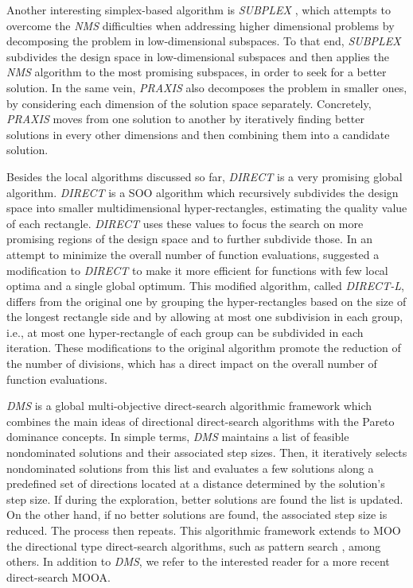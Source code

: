	Another interesting simplex-based algorithm is \textit{SUBPLEX} \cite{Rowan1990}, which attempts to overcome the \textit{\ac{NMS}} difficulties when addressing higher dimensional problems by decomposing the problem in low-dimensional subspaces. To that end, \textit{SUBPLEX} subdivides the design space in low-dimensional subspaces and then applies the \textit{\ac{NMS}} algorithm to the most promising subspaces, in order to seek for a better solution. %
	In the same vein, \textit{\ac{PRAXIS}} \cite{Brent1973} also decomposes the problem in smaller ones, by considering each dimension of the solution space separately. Concretely, \textit{\ac{PRAXIS}} moves from one solution to another by iteratively finding better solutions in every other dimensions and then combining them into a candidate solution. 
	
	Besides the local algorithms discussed so far, \textit{\ac{DIRECT}} is a very promising global algorithm. \textit{\ac{DIRECT}} \cite{Jones1993DIRECT} is a \ac{SOO} algorithm which recursively subdivides the design space into smaller multidimensional hyper-rectangles, estimating the quality value of each rectangle. \textit{\ac{DIRECT}} uses these values to focus the search on more promising regions of the design space and to further subdivide those. In an attempt to minimize the overall number of function evaluations, \cite{Gablonsky2001} suggested a modification to \textit{\ac{DIRECT}} to make it more efficient for functions with few local optima and a single global optimum. This modified algorithm, called \textit{\ac{DIRECT}-L}, differs from the original one by grouping the hyper-rectangles based on the size of the longest rectangle side and by allowing at most one subdivision in each group, i.e., at most one hyper-rectangle of each group can be subdivided in each iteration. These modifications to the original algorithm promote the reduction of the number of divisions, which has a direct impact on the overall number of function evaluations.
	
	\textit{\ac{DMS}} \cite{Custodio2010} is a global multi-objective direct-search algorithmic framework which combines the main ideas of directional direct-search algorithms with the Pareto dominance concepts. In simple terms, \textit{\ac{DMS}} maintains a list of feasible nondominated solutions and their associated step sizes. Then, it iteratively selects nondominated solutions from this list and evaluates a few solutions along a predefined set of directions located at a distance determined by the solution's step size. If during the exploration, better solutions are found the list is updated. On the other hand, if no better solutions are found, the associated step size is reduced. The process then repeats. This algorithmic framework extends to \ac{MOO} the directional type direct-search algorithms, such as pattern search \cite{Kolda2003}, among others. In addition to \textit{\ac{DMS}}, we refer \cite{Custodio2018} to the interested reader for a more recent direct-search \ac{MOOA}.
	
